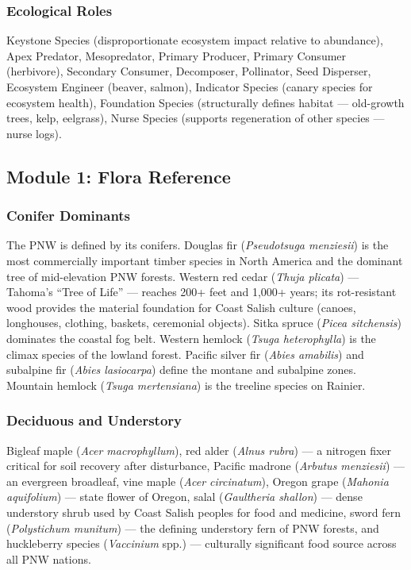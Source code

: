 \documentclass[11pt,letterpaper]{article}
\begin{document}
\subsubsection{Ecological Roles}

Keystone Species (disproportionate ecosystem impact relative to abundance), Apex Predator, Mesopredator, Primary Producer, Primary Consumer (herbivore), Secondary Consumer, Decomposer, Pollinator, Seed Disperser, Ecosystem Engineer (beaver, salmon), Indicator Species (canary species for ecosystem health), Foundation Species (structurally defines habitat --- old-growth trees, kelp, eelgrass), Nurse Species (supports regeneration of other species --- nurse logs).

\subsection{Module 1: Flora Reference}

\subsubsection{Conifer Dominants}

The PNW is defined by its conifers. Douglas fir (\emph{Pseudotsuga menziesii}) is the most commercially important timber species in North America and the dominant tree of mid-elevation PNW forests. Western red cedar (\emph{Thuja plicata}) --- Tahoma's ``Tree of Life'' --- reaches 200+ feet and 1,000+ years; its rot-resistant wood provides the material foundation for Coast Salish culture (canoes, longhouses, clothing, baskets, ceremonial objects). Sitka spruce (\emph{Picea sitchensis}) dominates the coastal fog belt. Western hemlock (\emph{Tsuga heterophylla}) is the climax species of the lowland forest. Pacific silver fir (\emph{Abies amabilis}) and subalpine fir (\emph{Abies lasiocarpa}) define the montane and subalpine zones. Mountain hemlock (\emph{Tsuga mertensiana}) is the treeline species on Rainier.

\subsubsection{Deciduous and Understory}

Bigleaf maple (\emph{Acer macrophyllum}), red alder (\emph{Alnus rubra}) --- a nitrogen fixer critical for soil recovery after disturbance, Pacific madrone (\emph{Arbutus menziesii}) --- an evergreen broadleaf, vine maple (\emph{Acer circinatum}), Oregon grape (\emph{Mahonia aquifolium}) --- state flower of Oregon, salal (\emph{Gaultheria shallon}) --- dense understory shrub used by Coast Salish peoples for food and medicine, sword fern (\emph{Polystichum munitum}) --- the defining understory fern of PNW forests, and huckleberry species (\emph{Vaccinium} spp.) --- culturally significant food source across all PNW nations.
\end{document}
